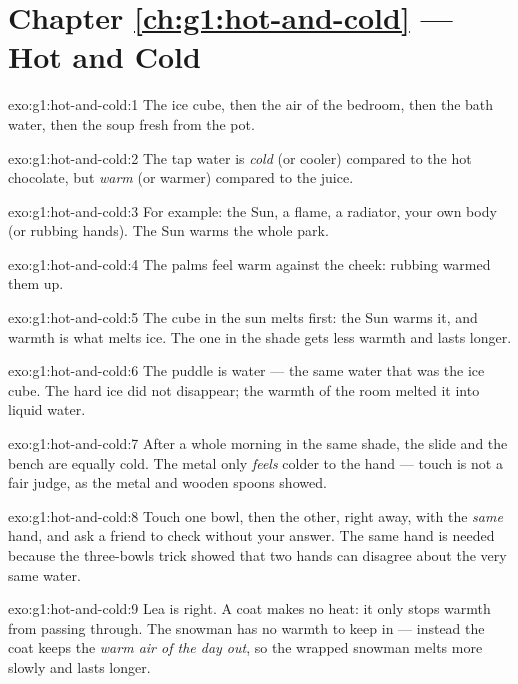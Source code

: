 \section*{Chapter \ref{ch:g1:hot-and-cold} --- Hot and Cold}

\begin{solution}{exo:g1:hot-and-cold:1}
The ice cube, then the air of the bedroom, then the bath water, then
the soup fresh from the pot.
\end{solution}

\begin{solution}{exo:g1:hot-and-cold:2}
The tap water is \emph{cold} (or cooler) compared to the hot
chocolate, but \emph{warm} (or warmer) compared to the juice.
\end{solution}

\begin{solution}{exo:g1:hot-and-cold:3}
For example: the Sun, a flame, a radiator, your own body (or rubbing
hands). The Sun warms the whole park.
\end{solution}

\begin{solution}{exo:g1:hot-and-cold:4}
The palms feel warm against the cheek: rubbing warmed them up.
\end{solution}

\begin{solution}{exo:g1:hot-and-cold:5}
The cube in the sun melts first: the Sun warms it, and warmth is what
melts ice. The one in the shade gets less warmth and lasts longer.
\end{solution}

\begin{solution}{exo:g1:hot-and-cold:6}
The puddle is water --- the same water that was the ice cube. The
hard ice did not disappear; the warmth of the room melted it into
liquid water.
\end{solution}

\begin{solution}{exo:g1:hot-and-cold:7}
After a whole morning in the same shade, the slide and the bench are
equally cold. The metal only \emph{feels} colder to the hand ---
touch is not a fair judge, as the metal and wooden spoons showed.
\end{solution}

\begin{solution}{exo:g1:hot-and-cold:8}
Touch one bowl, then the other, right away, with the \emph{same}
hand, and ask a friend to check without  your answer. The same
hand is needed because the three-bowls trick showed that two hands
can disagree about the very same water.
\end{solution}

\begin{solution}{exo:g1:hot-and-cold:9}
Lea is right. A coat makes no heat: it only stops warmth from passing
through. The snowman has no warmth to keep in --- instead the coat
keeps the \emph{warm air of the day out}, so the wrapped snowman
melts more slowly and lasts longer.
\end{solution}
